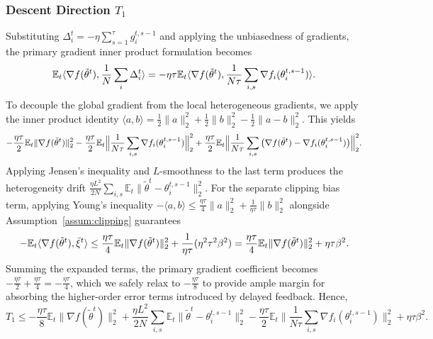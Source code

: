 \documentclass[conference]{IEEEtran}
\begin{document}
\subsubsection{Descent Direction $T_1$}
Substituting $\Delta_i^t = -\eta \sum_{s=1}^{\tau} g_i^{t,s-1}$ and applying the unbiasedness of gradients, the primary gradient inner product formulation becomes
\begin{equation}
    \mathbb{E}_t \langle \nabla f(\tilde{\theta}^t), \frac{1}{N}\sum_{i}\Delta_i^t \rangle = -\eta\tau \mathbb{E}_t \langle \nabla f(\tilde{\theta}^t), \frac{1}{N\tau}\sum_{i,s}\nabla f_i(\theta_i^{t,s-1}) \rangle. \notag
\end{equation}
To decouple the global gradient from the local heterogeneous gradients, we apply the inner product identity $\langle a,b\rangle = \frac{1}{2}\|a\|_2^2+\frac{1}{2}\|b\|_2^2-\frac{1}{2}\|a-b\|_2^2$. This yields
\begin{equation}
    -\frac{\eta\tau}{2}\mathbb{E}_t\|\nabla f(\tilde{\theta}^t)\|_2^2 - \frac{\eta\tau}{2}\mathbb{E}_t\Big\|\frac{1}{N\tau}\sum_{i,s}\nabla f_i(\theta_i^{t,s-1})\Big\|_2^2 + \frac{\eta\tau}{2}\mathbb{E}_t\Big\|\frac{1}{N\tau}\sum_{i,s}\big(\nabla f(\tilde{\theta}^t) - \nabla f_i(\theta_i^{t,s-1})\big)\Big\|_2^2. \notag
\end{equation}
Applying Jensen's inequality and $L$-smoothness to the last term produces the heterogeneity drift $\frac{\eta L^2}{2N} \sum_{i,s} \mathbb{E}_t \|\tilde{\theta}^t - \theta_i^{t,s-1}\|_2^2$.
For the separate clipping bias term, applying Young's inequality $-\langle a,b\rangle \le \frac{\eta\tau}{4}\|a\|_2^2 + \frac{1}{\eta\tau}\|b\|_2^2$ alongside Assumption~\ref{assum:clipping} guarantees
\begin{equation}
    -\mathbb{E}_t\langle \nabla f(\tilde{\theta}^t), \bar{\xi}^t\rangle \le \frac{\eta\tau}{4}\mathbb{E}_t\|\nabla f(\tilde{\theta}^t)\|_2^2 + \frac{1}{\eta\tau} (\eta^2\tau^2 \beta^2) = \frac{\eta\tau}{4}\mathbb{E}_t\|\nabla f(\tilde{\theta}^t)\|_2^2 + \eta\tau\beta^2. \notag
\end{equation}
Summing the expanded terms, the primary gradient coefficient becomes $-\frac{\eta\tau}{2} + \frac{\eta\tau}{4} = -\frac{\eta\tau}{4}$, which we safely relax to $-\frac{\eta\tau}{8}$ to provide ample margin for absorbing the higher-order error terms introduced by delayed feedback. Hence,
\begin{equation} \label{eqn:t1_bound}
    T_1 \le -\frac{\eta\tau}{8} \mathbb{E}_t \|\nabla f(\tilde{\theta}^t)\|_2^2 + \frac{\eta L^2}{2N} \sum_{i,s} \mathbb{E}_t \|\tilde{\theta}^t - \theta_i^{t,s-1}\|_2^2 - \frac{\eta\tau}{2} \mathbb{E}_t \Big\|\frac{1}{N\tau}\sum_{i,s}\nabla f_i(\theta_i^{t,s-1})\Big\|_2^2 + \eta\tau\beta^2.
\end{equation}
\end{document}
